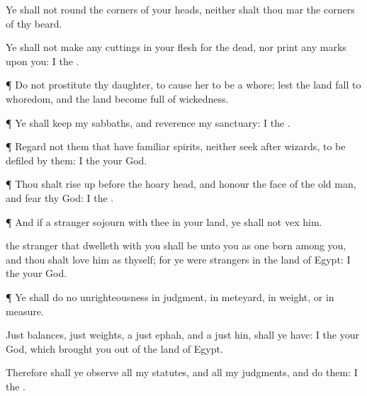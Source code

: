 {Ye shall not
round the
corners of your
heads, neither shalt thou
mar the
corners of thy
beard.

Ye shall not
make
any
cuttings in your
flesh for the
dead, nor
print any
marks upon you: I
{} the
{}.


\par }{\PP {}¶ Do not
prostitute thy
daughter, to cause her to be a
whore; lest the
land fall to
whoredom, and the
land become
full of
wickedness.


\par }{\PP {}¶ Ye shall
keep my
sabbaths, and
reverence my
sanctuary: I
{} the
{}.


\par }{\PP {}¶
Regard not them that have familiar
spirits, neither
seek after
wizards, to be
defiled by them: I
{} the
{} your
God.


\par }{\PP {}¶ Thou shalt rise
up
before the hoary
head, and
honour the
face of the old
man, and
fear thy
God: I
{} the
{}.


\par }{\PP {}¶ And if a
stranger
sojourn with thee in your
land, ye shall not
vex him.

 the
stranger that
dwelleth with you shall be unto you as one
born among you, and thou shalt
love him as thyself; for ye were
strangers in the
land of
Egypt: I
{} the
{} your
God.


\par }{\PP {}¶ Ye shall
do no
unrighteousness in
judgment, in
meteyard, in
weight, or in
measure.

Just
balances,
just
weights, a
just
ephah, and a
just
hin, shall ye have: I
{} the
{} your
God, which brought you
out of the
land of
Egypt.

Therefore shall ye
observe all my
statutes, and all my
judgments, and
do them: I
{} the
{}.




\par }
